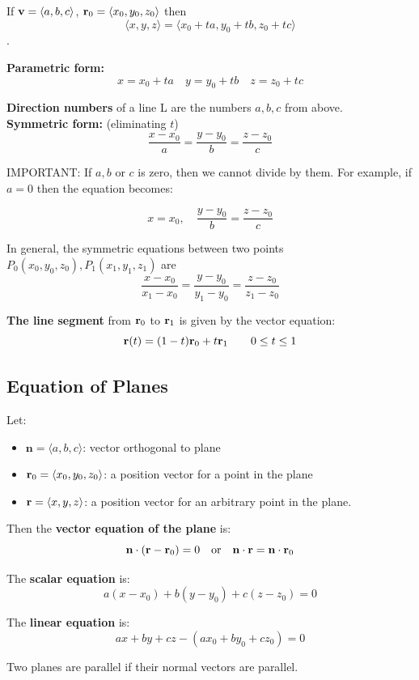 \documentclass{report}
\begin{document}
If $\mathbf{v} = \langle a, b, c\rangle$, $\mathbf{r}_0 = \langle x_0, y_0, z_0 \rangle$ then 
\[
\langle x, y, z\rangle =  \langle x_0 + t a, y_0 + t b, z_0 + t c\rangle
\].

\textbf{Parametric form:}
\[
x = x_0 + t a \quad y = y_0 + t b \quad z = z_0 + t c
\]

\textbf{Direction numbers} of a line L are the numbers $a, b, c$ from above. 
\\

\textbf{Symmetric form:} (eliminating $t$) 
\[
\frac{x - x_0}{a} = \frac{y - y_0}{b} = \frac{z - z_0}{c}
\]

IMPORTANT: If $a, b$ or $c$ is zero, then we cannot divide by them.
For example, if $a = 0$ then the equation becomes:

\[
x = x_0, \quad \frac{y - y_0}{b} = \frac{z - z_0}{c}
\]

In general, the symmetric equations between two points $P_0(x_0, y_0, z_0), P_1(x_1, y_1, z_1)$ are 
\[
\frac{x - x_0}{x_1 - x_0} = \frac{y - y_0}{y_1 - y_0} = \frac{z - z_0}{z_1 - z_0}
\]

\textbf{The line segment} from $\mathbf{r}_0$ to $\mathbf{r}_1$ is given by the vector equation:
\[
\mathbf{r}(t) = (1 - t)\mathbf{r}_0 + t \mathbf{r}_1 \quad \quad 0 \le t \le 1
\]

\subsection{Equation of Planes}

Let: 
\begin{itemize}
    \item $\mathbf{n} = \langle a, b, c \rangle$: vector orthogonal to plane
    \item $\mathbf{r}_0 = \langle x_0, y_0, z_0 \rangle$: a position vector for a point in the plane 
    \item $\mathbf{r} = \langle x, y, z \rangle$: a position vector for an arbitrary point in the plane.
\end{itemize}

Then the \textbf{vector equation of the plane} is: 
\[
\mathbf{n} \cdot (\mathbf{r} - \mathbf{r}_0) = 0 \quad \text{or} \quad \mathbf{n} \cdot \mathbf{r} = \mathbf{n} \cdot \mathbf{r}_0
\]

The \textbf{scalar equation} is:
\[
a(x - x_0) + b(y - y_0) + c(z - z_0) = 0
\]

The \textbf{linear equation} is:
\[
ax + by + cz - (a x_0 + b y_0 + c z_0) = 0
\] 

Two planes are parallel if their normal vectors are parallel.
\end{document}

